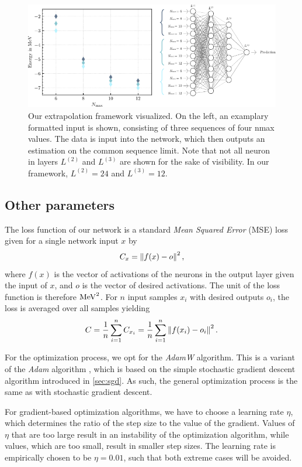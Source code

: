 \begin{figure}[H]
  \centering
  \includegraphics[width=\textwidth]{media/netviz.pdf}
  \caption{Our extrapolation framework visualized. On the left, an examplary formatted input is shown, consisting of three sequences of four nmax values. The data is input into the network, which then outputs an estimation on the common sequence limit. Note that not all neuron in layers $L^{(2)}$ and $L^{(3)}$ are shown for the sake of visibility. In our framework, $L^{(2)} = 24$ and $L^{(3)} = 12$.}
  \label{fig:dataflow}
\end{figure}
\subsection{Other parameters}
The loss function of our network is a standard \textit{Mean Squared Error} (MSE) loss given for a single network input $x$ by
\begin{equation}
  C_x = \left\lVert f(x)-o\right\rVert^2,
\end{equation}
where $f(x)$ is the vector of activations of the neurons in the output layer given the input of $x$, and $o$ is the vector of desired activations. The unit of the loss function is therefore $\si[]{\mega\electronvolt\squared}$. For $n$ input samples $x_i$ with desired outputs $o_i$, the loss is averaged over all samples yielding
\begin{equation}
  C = \frac{1}{n}\sum_{i=1}^n C_{x_i}=\frac{1}{n} \sum_{i=1}^{n}\left\lVert f(x_i)-o_i\right\rVert^2.
\end{equation}

For the optimization process, we opt for the \textit{AdamW} algorithm. This is a variant of the \textit{Adam} algorithm \cite{adamw, adam}, which is based on the simple stochastic gradient descent algorithm introduced in \autoref{sec:sgd}. As such, the general optimization process is the same as with stochastic gradient descent.

For gradient-based optimization algorithms, we have to choose a learning rate $\eta$, which determines the ratio of the step size to the value of the gradient. Values of $\eta$ that are too large result in an instability of the optimization algorithm, while values, which are too small, result in smaller step sizes. The learning rate is empirically chosen to be $\eta = 0.01$, such that both extreme cases will be avoided.

